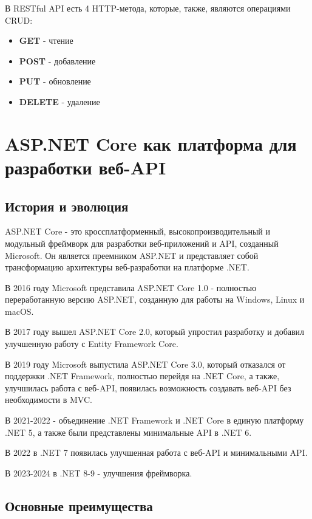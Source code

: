 \documentclass[a4paper,12pt]{report}
\begin{document}
В \acs{REST}ful \acs{API} есть 4 \acs{HTTP}-метода, которые, также, являются операциями \acs{CRUD}:
\begin{itemize}
    \item
        \textbf{GET} - чтение
    \item 
        \textbf{POST} - добавление
    \item
        \textbf{PUT} - обновление
    \item
        \textbf{DELETE} - удаление
\end{itemize}

\section{ASP.NET Core как платформа для разработки веб-\acs{API}}

\subsection{История и эволюция}
ASP.NET Core - это кроссплатформенный, высокопроизводительный и модульный фреймворк для разработки веб-приложений и \acs{API}, созданный Microsoft. 
Он является преемником ASP.NET и представляет собой трансформацию архитектуры веб-разработки на платформе .NET.

В 2016 году Microsoft представила ASP.NET Core 1.0 - полностью переработанную версию ASP.NET, созданную для работы на Windows, Linux и macOS.

В 2017 году вышел ASP.NET Core 2.0, который упростил разработку и добавил улучшенную работу с Entity Framework Core.

В 2019 году Microsoft выпустила ASP.NET Core 3.0, который отказался от поддержки .NET Framework, полностью перейдя на .NET Core, 
а также, улучшилась работа с веб-\acs{API}, появилась возможность создавать веб-\acs{API} без необходимости в \acs{MVC}.

В 2021-2022 - объединение .NET Framework и .NET Core в единую платформу .NET 5, а также были представлены минимальные \acs{API} в .NET 6.

В 2022 в .NET 7 появилась улучшенная работа с веб-\acs{API} и минимальными \acs{API}.

В 2023-2024 в .NET 8-9 - улучшения фреймворка.

\subsection{Основные преимущества}
\end{document}
